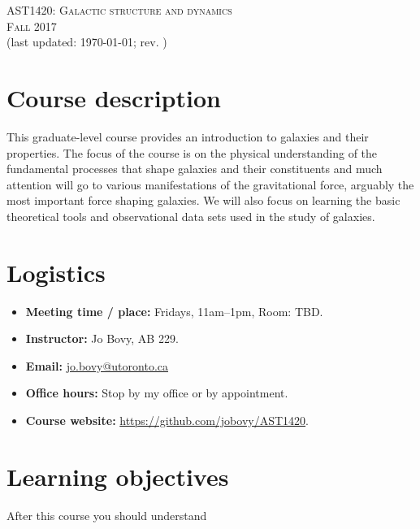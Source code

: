 \documentclass{article}
\begin{document}
\begin{center}
  \LARGE{\scshape{AST1420: Galactic structure and dynamics}}\\[5pt]
  \Large{\scshape{Fall 2017}}\\[5pt]
  \large{(last updated: \today; rev. \githash)}\\[25pt]
\end{center}

\section*{Course description}

This graduate-level course provides an introduction to galaxies and
their properties. The focus of the course is on the physical
understanding of the fundamental processes that shape galaxies and
their constituents and much attention will go to various
manifestations of the gravitational force, arguably the most important
force shaping galaxies. We will also focus on learning the basic
theoretical tools and observational data sets used in the study of
galaxies.

\section*{Logistics}

\begin{itemize}

  \item {\bf Meeting time / place:} Fridays, 11am--1pm, Room: TBD.

  \item {\bf Instructor:} Jo Bovy, AB 229.

  \item {\bf Email:} \href{mailto:jo.bovy@utoronto.ca}{jo.bovy@utoronto.ca}

  \item {\bf Office hours:} Stop by my office or by appointment.

  \item {\bf Course website:} \url{https://github.com/jobovy/AST1420}.

\end{itemize}

\section*{Learning objectives}

After this course you should understand
\end{document}
